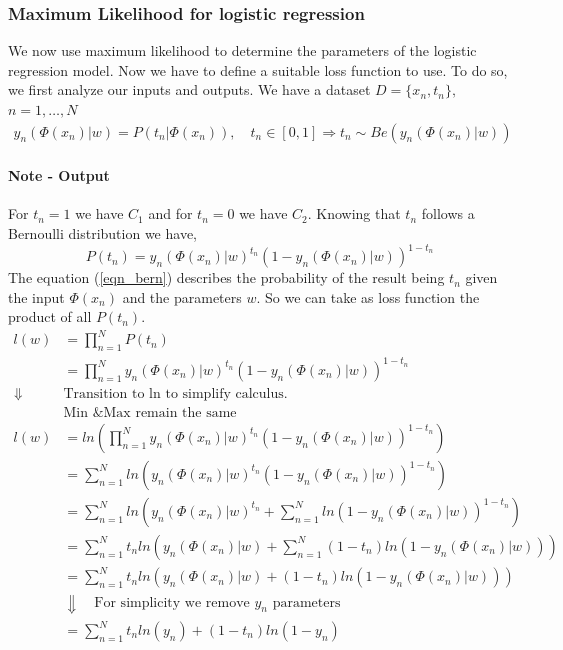 \documentclass[main.tex]{subfiles}
\begin{document}
\subsubsection{Maximum Likelihood for logistic regression}
We now use maximum likelihood to determine the parameters of the logistic regression model. Now we have to define a suitable loss function to use. To do so, we first analyze our inputs and outputs. We have a dataset $D = \{x_n, t_n\},$ $n=1,\dots,N$
\begin{align*}
    y_n(\Phi(x_n)|w) = P(t_n|\Phi(x_n)), \quad t_n \in [0,1] \Rightarrow t_n \sim Be(y_n(\Phi(x_n)|w))
\end{align*}
\paragraph{Note - Output} For $t_n = 1$ we have $C_1$ and for $t_n = 0$ we have $C_2$.
\newline \newline
Knowing that $t_n$ follows a Bernoulli distribution we have,
\begin{equation}
    P(t_n) = y_n(\Phi(x_n)|w)^{t_n} (1 - y_n(\Phi(x_n)|w))^{1- t_n} \label{eqn_bern}
\end{equation}
The equation (\ref{eqn_bern}) describes the probability of the result being $t_n$ given the input $\Phi(x_n)$ and the parameters $w$. So we can take as loss function the product of all $P(t_n)$.
\begin{align*}
    l(w) &= \prod_{n=1}^N P(t_n) \\
    &= \prod_{n=1}^N y_n(\Phi(x_n)|w)^{t_n} (1 - y_n(\Phi(x_n)|w))^{1- t_n} \\
    \Downarrow \quad & \text{Transition to ln to simplify calculus.} \\
    & \text{Min \& Max remain the same}\\
    l(w) &= ln(\prod_{n=1}^N y_n(\Phi(x_n)|w)^{t_n} (1 - y_n(\Phi(x_n)|w))^{1- t_n}) \\
    &= \sum_{n=1}^N ln(y_n(\Phi(x_n)|w)^{t_n} (1 - y_n(\Phi(x_n)|w))^{1- t_n}) \\
    &= \sum_{n=1}^N ln(y_n(\Phi(x_n)|w)^{t_n} + \sum_{n=1}^N ln(1 - y_n (\Phi(x_n)|w))^{1- t_n}) \\
    &= \sum_{n=1}^N t_n ln(y_n(\Phi(x_n)|w) + \sum_{n=1}^N (1 - t_n)ln(1 - y_n (\Phi(x_n)|w))) \\
    &= \sum_{n=1}^N t_n ln(y_n(\Phi(x_n)|w) + (1 - t_n)ln(1 - y_n (\Phi(x_n)|w))) \\
    &\Downarrow \quad \text{For simplicity we remove }y_n\text{ parameters} \\
    &= \sum_{n=1}^N t_n ln(y_n) + (1 - t_n)ln(1 - y_n)
\end{align*}
\end{document}
